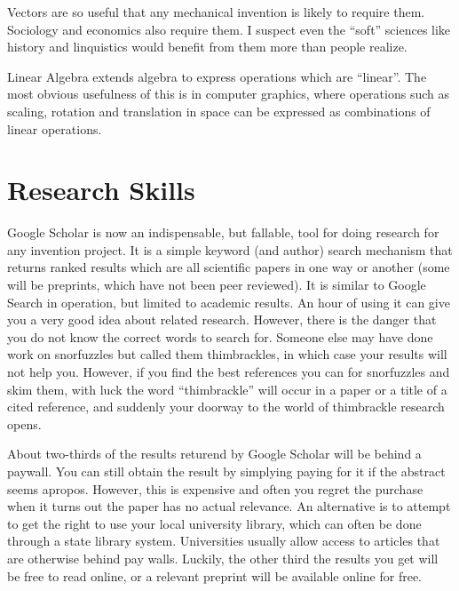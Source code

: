 \documentclass[
	fontsize=10pt, %
	twoside=false, %
	secnumdepth=1, %
]{kaobook}
\begin{document}
Vectors are so useful that any mechanical invention is
likely to require them. Sociology and economics also require them.
I suspect even the ``soft'' sciences
like history and linquistics would benefit from them more than people realize.

Linear Algebra extends algebra to express operations which are ``linear''.
The most obvious usefulness of this is in computer graphics, where operations
such as scaling, rotation and translation in space can be expressed as
combinations of linear operations.

\section{Research Skills}
Google Scholar is now an indispensable, but fallable, tool for doing research for
any invention project.
It is a simple keyword (and author) search mechanism that returns ranked results
which are all scientific papers in one way or another (some will be preprints, which have not been peer reviewed). It is similar to Google Search in operation,
but limited to academic results.
An hour of using it can give you a very good idea about related research.
However, there is the danger that you do not know the correct words to
search for.
Someone else may have done work on snorfuzzles but called them thimbrackles,
in which case your results will not help you. However, if you find the
best references you can for snorfuzzles and skim them, with luck the word ``thimbrackle''
will occur in a paper or a title of a cited reference, and suddenly
your doorway to the world of thimbrackle research opens.

About two-thirds of the results returend by Google Scholar will be behind a paywall.
You can still obtain the result by simplying paying for it
if the abstract seems apropos.
However, this
is expensive and often you regret the purchase when it turns out the
paper has no actual relevance. An alternative is to attempt to get
the right to use your local university library, which can often be
done through a state library system. Universities usually allow
access to articles that are otherwise behind pay walls.
Luckily, the other third the results you get will be free to read online,
or a relevant preprint will be available online for free.
\end{document}
